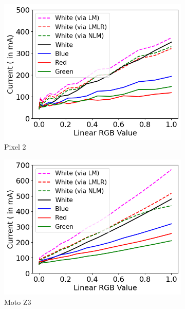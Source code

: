\begin{figure}[tp]
	\begin{subfigure}[]{0.31\textwidth}
		\includegraphics[width=\textwidth]{figure/002_Pixel2_linear_model.png}
		\caption{Pixel 2}
		\label{fig:initial_evaluation_2_n6_w}
	\end{subfigure}
	\hfill
	\begin{subfigure}[]{0.31\textwidth}
		\includegraphics[width=\textwidth]{figure/003_MotoZ3_linear_model.png}
		\caption{Moto Z3}
		\label{fig:initial_evaluation_2_p2_w}
	\end{subfigure}
	\hfill
	\begin{subfigure}[]{0.31\textwidth}

\end{subfigure}
\end{figure}
